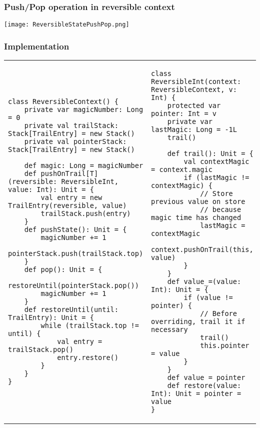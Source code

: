 \subsubsection{Push/Pop operation in reversible context}
\begin{center}
    \texttt{[image: ReversibleStatePushPop.png]}
\end{center}

\subsubsection{Implementation}

\begin{tabular}{m{8cm}m{7cm}}
\begin{lstlisting}[mathescape]
class ReversibleContext() {
    private var magicNumber: Long = 0
    private val trailStack: Stack[TrailEntry] = new Stack()
    private val pointerStack: Stack[TrailEntry] = new Stack()

    def magic: Long = magicNumber
    def pushOnTrail[T](reversible: ReversibleInt, value: Int): Unit = {
        val entry = new TrailEntry(reversible, value)
        trailStack.push(entry)
    }
    def pushState(): Unit = {
        magicNumber += 1
        pointerStack.push(trailStack.top)
    }
    def pop(): Unit = {
        restoreUntil(pointerStack.pop())
        magicNumber += 1
    }
    def restoreUntil(until: TrailEntry): Unit = {
        while (trailStack.top != until) {
            val entry = trailStack.pop()
            entry.restore()
        }
    }
}
\end{lstlisting}
& 
\begin{lstlisting}[mathescape]
class ReversibleInt(context: ReversibleContext, v: Int) {
    protected var pointer: Int = v
    private var lastMagic: Long = -1L
    trail()

    def trail(): Unit = {
        val contextMagic = context.magic
        if (lastMagic != contextMagic) {
            // Store previous value on store 
            // because magic time has changed
            lastMagic = contextMagic
            context.pushOnTrail(this, value)
        }
    }
    def value_=(value: Int): Unit = {
        if (value != pointer) {
            // Before overriding, trail it if necessary
            trail()
            this.pointer = value
        }
    }
    def value = pointer
    def restore(value: Int): Unit = pointer = value
}
\end{lstlisting}
\end{tabular}

